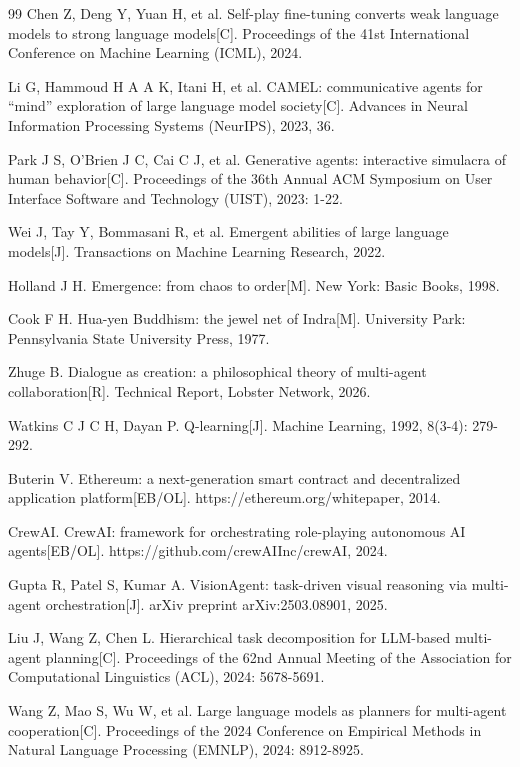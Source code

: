 \documentclass[12pt,a4paper]{ctexart}
\begin{document}
\begin{thebibliography}{99}
Chen Z, Deng Y, Yuan H, et al. Self-play fine-tuning converts weak language models to strong language models[C]. Proceedings of the 41st International Conference on Machine Learning (ICML), 2024.

Li G, Hammoud H A A K, Itani H, et al. CAMEL: communicative agents for ``mind'' exploration of large language model society[C]. Advances in Neural Information Processing Systems (NeurIPS), 2023, 36.

Park J S, O'Brien J C, Cai C J, et al. Generative agents: interactive simulacra of human behavior[C]. Proceedings of the 36th Annual ACM Symposium on User Interface Software and Technology (UIST), 2023: 1-22.

Wei J, Tay Y, Bommasani R, et al. Emergent abilities of large language models[J]. Transactions on Machine Learning Research, 2022.

Holland J H. Emergence: from chaos to order[M]. New York: Basic Books, 1998.

Cook F H. Hua-yen Buddhism: the jewel net of Indra[M]. University Park: Pennsylvania State University Press, 1977.

Zhuge B. Dialogue as creation: a philosophical theory of multi-agent collaboration[R]. Technical Report, Lobster Network, 2026.

Watkins C J C H, Dayan P. Q-learning[J]. Machine Learning, 1992, 8(3-4): 279-292.

Buterin V. Ethereum: a next-generation smart contract and decentralized application platform[EB/OL]. https://ethereum.org/whitepaper, 2014.

CrewAI. CrewAI: framework for orchestrating role-playing autonomous AI agents[EB/OL]. https://github.com/crewAIInc/crewAI, 2024.

Gupta R, Patel S, Kumar A. VisionAgent: task-driven visual reasoning via multi-agent orchestration[J]. arXiv preprint arXiv:2503.08901, 2025.

Liu J, Wang Z, Chen L. Hierarchical task decomposition for LLM-based multi-agent planning[C]. Proceedings of the 62nd Annual Meeting of the Association for Computational Linguistics (ACL), 2024: 5678-5691.

Wang Z, Mao S, Wu W, et al. Large language models as planners for multi-agent cooperation[C]. Proceedings of the 2024 Conference on Empirical Methods in Natural Language Processing (EMNLP), 2024: 8912-8925.


\end{thebibliography}
\end{document}

